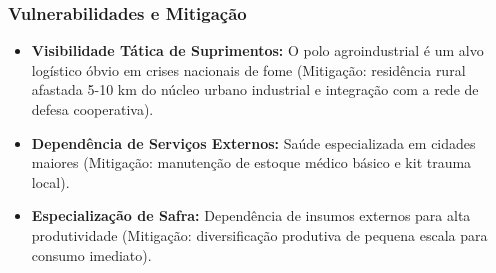 \subsubsection{Vulnerabilidades e
Mitigação}

\begin{itemize}
\tightlist
\item
  \textbf{Visibilidade Tática de Suprimentos:} O polo agroindustrial é
  um alvo logístico óbvio em crises nacionais de fome (Mitigação:
  residência rural afastada 5-10 km do núcleo urbano industrial e
  integração com a rede de defesa cooperativa).
\item
  \textbf{Dependência de Serviços Externos:} Saúde especializada em
  cidades maiores (Mitigação: manutenção de estoque médico básico e kit
  trauma local).
\item
  \textbf{Especialização de Safra:} Dependência de insumos externos para
  alta produtividade (Mitigação: diversificação produtiva de pequena
  escala para consumo imediato).
\end{itemize}

